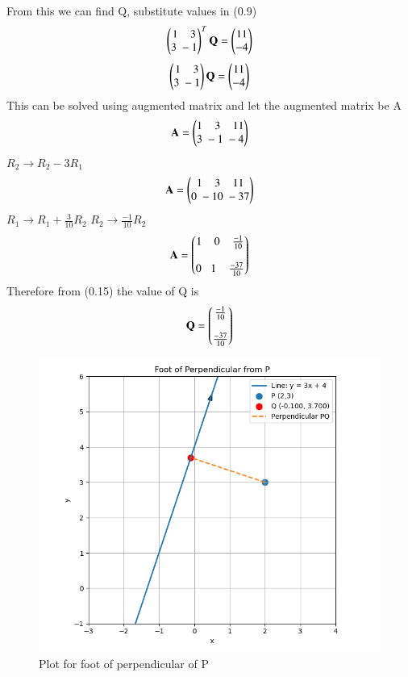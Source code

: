 \documentclass[journal]{IEEEtran}
\begin{document}
         From this we can find Q, substitute values in (0.9)
         \begin{align}
             \begin{pmatrix}1\;\;\;\;3\\3\;-1\end{pmatrix}^T\mathbf{Q}=\begin{pmatrix}11\\-4\end{pmatrix}
         \end{align}
         \begin{align}
             \begin{pmatrix}1\;\;\;\;3\\3\;-1\end{pmatrix}\mathbf{Q}=\begin{pmatrix}11\\-4\end{pmatrix}
         \end{align}
         This can be solved using augmented matrix and let the augmented matrix be A
         \begin{align}
             \mathbf{A}=\begin{pmatrix}1\;\;\;\;3\;\;\;\;11\\3\;-1\;-4\end{pmatrix}
         \end{align}
         $R_2\rightarrow{R_2-3R_1}$
         \begin{align}
             \mathbf{A}=\begin{pmatrix}1\;\;\;\;3\;\;\;\;11\\0\;-10\;-37\end{pmatrix}
         \end{align}
         $R_1\rightarrow{R_1+\frac{3}{10}R_2}$ \hspace{1cm}
         $R_2\rightarrow{\frac{-1}{10}R_2}$
         \begin{align}
             \mathbf{A}=\begin{pmatrix}1\;\;\;\;0\;\;\;\;\frac{-1}{10}\\\\0\;\;\;1\;\;\;\;\frac{-37}{10}\end{pmatrix}
         \end{align}
         Therefore from (0.15) the value of Q is
         \begin{align}
             \mathbf{Q}=\begin{pmatrix}\frac{-1}{10}\\\\ \frac{-37}{10}\end{pmatrix}
         \end{align}
         \begin{figure}
             \centering
             \includegraphics[width=0.7\columnwidth]{figs/fig1.png}
             \caption{Plot for foot of perpendicular of P}
             \label{fig1}
         \end{figure}
    
         
\end{document}
